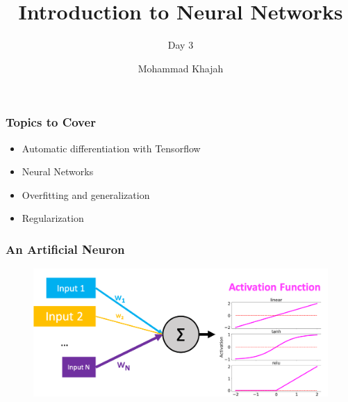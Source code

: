 \documentclass{beamer}
\title{Introduction to Neural Networks}
\subtitle{Day 3}
\author{Mohammad Khajah}
\institute[KISR]{Kuwait Institute for Scientific Research}
\date{}
\begin{document}
\begin{frame}
\titlepage
\end{frame}

\begin{frame}
\frametitle{Topics to Cover}

\begin{itemize}
\item Automatic differentiation with Tensorflow
\item Neural Networks
\item Overfitting and generalization
\item Regularization
\end{itemize}

\end{frame}

\begin{frame}
\frametitle{An Artificial Neuron}
 \begin{figure}
\includegraphics[width=\textwidth]{../figures/neuron.png}
\end{figure}
\end{frame}
\end{document}
